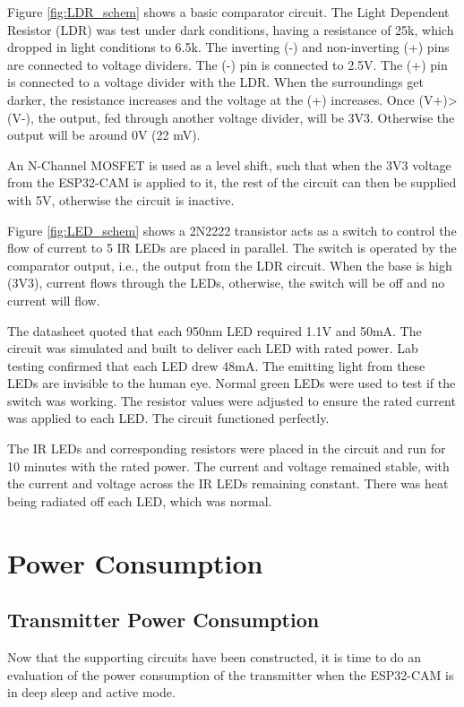 \documentclass[class=report,11pt,crop=false]{standalone}
\begin{document}
Figure \ref{fig:LDR_schem} shows a basic comparator circuit. The Light Dependent Resistor (LDR) was test under dark conditions, having a resistance of 25k, which dropped in light conditions to 6.5k. The inverting (-) and non-inverting (+) pins are connected to voltage dividers. The (-) pin is connected to 2.5V. The (+) pin is connected to a voltage divider with the LDR. When the surroundings get darker, the resistance increases and the voltage at the (+) increases. Once (V+)>(V-), the output, fed through another voltage divider, will be 3V3. Otherwise the output will be around 0V (22 mV). 

An N-Channel MOSFET is used as a level shift, such that when the 3V3 voltage from the ESP32-CAM is applied to it, the rest of the circuit can then be supplied with 5V, otherwise the circuit is inactive.

Figure \ref{fig:LED_schem} shows a 2N2222 transistor acts as a switch to control the flow of current to 5 IR LEDs are placed in parallel. The switch is operated by the comparator output, i.e., the output from the LDR circuit. When the base is high (3V3), current flows through the LEDs, otherwise, the switch will be off and no current will flow. 

The datasheet quoted that each 950nm LED required 1.1V and 50mA. The circuit was simulated and built to deliver each LED with rated power. Lab testing confirmed that each LED drew 48mA. The emitting light from these LEDs are invisible to the human eye. Normal green LEDs were used to test if the switch was working. The resistor values were adjusted to ensure the rated current was applied to each LED. The circuit functioned perfectly. 

The IR LEDs and corresponding resistors were placed in the circuit and run for 10 minutes with the rated power. The current and voltage remained stable, with the current and voltage across the IR LEDs remaining constant. There was heat being radiated off each LED, which was normal. 

\section{Power Consumption}\label{sc: HW_PC}
\subsection{Transmitter Power Consumption}
Now that the supporting circuits have been constructed, it is time to do an evaluation of the power consumption of the transmitter when the ESP32-CAM is in deep sleep and active mode. 
\end{document}
